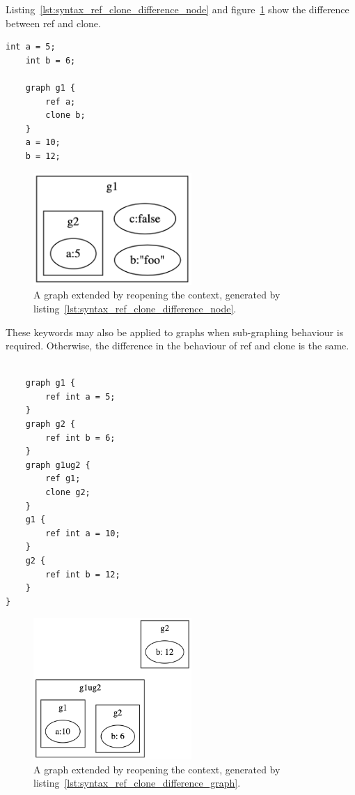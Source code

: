 Listing~\ref{lst:syntax_ref_clone_difference_node} and figure~\ref{fig:syntax_ref_vs_clone} show the difference between ref and clone.

\begin{lstlisting}[caption={Example code, showcasing the difference between ref and clone.},captionpos=b,label={lst:syntax_ref_clone_difference_node}]
    int a = 5;
    int b = 6;

    graph g1 {
        ref a;
        clone b;
    }
    a = 10;
    b = 12;
\end{lstlisting}
\begin{figure}[H]
    \centering
    \includegraphics[width=6cm]{figures/syntax_section/syntax_basic_subgraph}
    \caption{A graph extended by reopening the context, generated by listing~\ref{lst:syntax_ref_clone_difference_node}.}
    \label{fig:syntax_ref_vs_clone}
\end{figure}

These keywords may also be applied to graphs when sub-graphing behaviour is required.
Otherwise, the difference in the behaviour of ref and clone is the same.

\begin{lstlisting}[caption={Ref and clone with graphs.},captionpos=b, label={lst:syntax_ref_clone_difference_graph}]

    graph g1 {
        ref int a = 5;
    }
    graph g2 {
        ref int b = 6;
    }
    graph g1ug2 {
        ref g1;
        clone g2;
    }
    g1 {
        ref int a = 10;
    }
    g2 {
        ref int b = 12;
    }
}
\end{lstlisting}
\begin{figure}[H]
    \centering
    \includegraphics[width=6cm]{figures/syntax_section/syntax_ref_vs_clone_graphs}
    \caption{A graph extended by reopening the context, generated by listing~\ref{lst:syntax_ref_clone_difference_graph}.}
    \label{fig:syntax_ref_vs_clone_with_graphs}
\end{figure}

